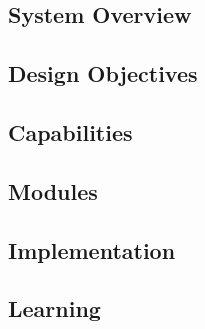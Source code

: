 \subsection{System Overview}\label{ch:architecture:mios:overview}

\subsection{Design Objectives}\label{ch:architecture:mios:design}

\subsection{Capabilities}\label{ch:architecture:mios:capabilities}

\subsection{Modules}\label{ch:architecture:mios:modules}

\subsection{\skillmodelabbr{} Implementation}\label{ch:architecture:mios:ggtwrep}

\subsection{Learning}\label{ch:architecture:mios:learning}

